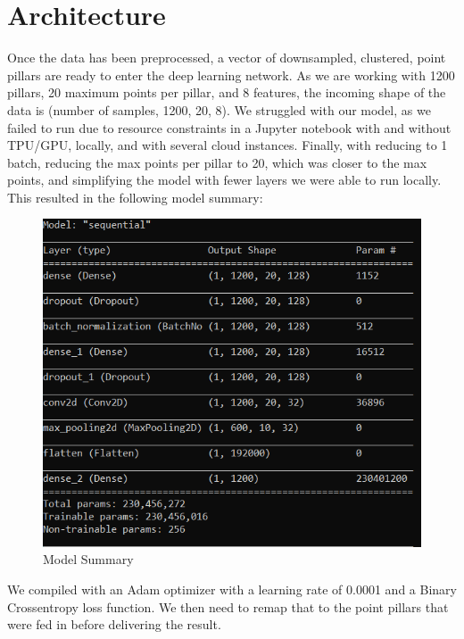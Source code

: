 \documentclass{article}
\begin{document}
\section{Architecture}
Once the data has been preprocessed, a vector of downsampled, clustered, point pillars are ready to enter the deep learning network. As we are working with 1200 pillars, 20 maximum points per pillar, and 8 features, the incoming shape of the data is (number of samples, 1200, 20, 8). We struggled with our model, as we failed to run due to resource constraints in a Jupyter notebook with and without TPU/GPU, locally, and with several cloud instances. Finally, with reducing to 1 batch, reducing the max points per pillar to 20, which was closer to the max points, and simplifying the model with fewer layers we were able to run locally. This resulted in the following model summary:
\begin{figure}[htp]
    \centering
    \includegraphics[scale=0.8]{model2.png}
    \caption{Model Summary}
    \label{fig:modelSummary}
\end{figure}
We compiled with an Adam optimizer with a learning rate of 0.0001 and a Binary Crossentropy loss function. We then need to remap that to the point pillars that were fed in before delivering the result. 
\end{document}
